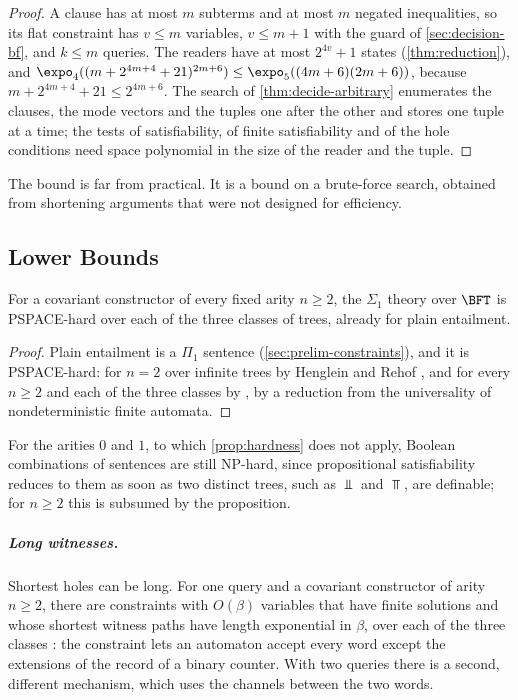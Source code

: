 \begin{proof}
A clause has at most $m$ subterms and at most $m$ negated inequalities, so
its flat constraint has $v\le m$ variables, $v\le m+1$ with the guard of
\cref{sec:decision-bf}, and $k\le m$ queries. The readers have at most
$2^{4v}+1$ states (\cref{thm:reduction}), and
$\expo_4((m+2^{4m+4}+21)^{2m+6})\le\expo_5((4m+6)(2m+6))$, because
$m+2^{4m+4}+21\le2^{4m+6}$. The search of
\cref{thm:decide-arbitrary} enumerates the clauses, the mode vectors and the
tuples one after the other and stores one tuple at a time; the tests of
satisfiability, of finite satisfiability and of the hole conditions need
space polynomial in the size of the reader and the tuple.
\end{proof}

The bound is far from practical. It is a bound on a brute-force search, obtained from
shortening arguments that were not designed for efficiency.

\subsection{Lower Bounds}\label{sec:complexity-lower}

\begin{proposition}[Hardness]\label{prop:hardness}
For a covariant constructor of every fixed arity $n\ge2$, the $\Sigma_1$
theory over $\BFT$ is PSPACE-hard over each of the three classes of trees,
already for plain entailment.
\end{proposition}

\begin{proof}
Plain entailment is a $\Pi_1$ sentence (\cref{sec:prelim-constraints}), and
it is PSPACE-hard: for $n=2$ over infinite trees by Henglein and Rehof
\cite{HengleinRehof98}, and for every $n\ge2$ and each of the three classes
by \cite{Zhao26}, by a reduction from the universality of nondeterministic
finite automata.
\end{proof}

For the arities $0$ and $1$, to which \cref{prop:hardness} does not apply,
Boolean combinations of sentences are still NP-hard, since propositional
satisfiability reduces to them as soon as two distinct trees, such as $\Bot$
and $\Top$, are definable; for $n\ge2$ this is subsumed by the proposition.

\subparagraph*{Long witnesses.}
Shortest holes can be long. For one query and a covariant constructor of
arity $n\ge2$, there are constraints with $O(\beta)$ variables that have
finite solutions and whose shortest witness paths have length exponential in
$\beta$, over each of the three classes \cite{Zhao26}: the constraint lets
an automaton accept every word except the extensions of the record of a
binary counter. With two queries there is a second, different mechanism,
which uses the channels between the two words.

